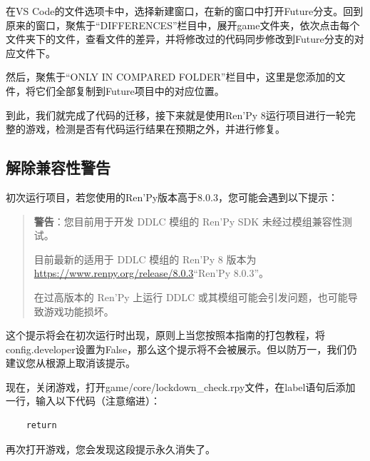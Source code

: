 在VS Code的文件选项卡中，选择新建窗口，在新的窗口中打开Future分支。回到原来的窗口，聚焦于“DIFFERENCES”栏目中，展开game文件夹，依次点击每个文件夹下的文件，查看文件的差异，并将修改过的代码同步修改到Future分支的对应文件下。

然后，聚焦于“ONLY IN COMPARED FOLDER”栏目中，这里是您添加的文件，将它们全部复制到Future项目中的对应位置。

到此，我们就完成了代码的迁移，接下来就是使用Ren'Py 8运行项目进行一轮完整的游戏，检测是否有代码运行结果在预期之外，并进行修复。

\subsection{解除兼容性警告}
初次运行项目，若您使用的Ren'Py版本高于8.0.3，您可能会遇到以下提示：

\begin{quote}
    \textbf{警告}：您目前用于开发 DDLC 模组的 Ren'Py SDK 未经过模组兼容性测试。

    目前最新的适用于 DDLC 模组的 Ren'Py 8 版本为\url{https://www.renpy.org/release/8.0.3}“Ren'Py 8.0.3”。
    
    在过高版本的 Ren'Py 上运行 DDLC 或其模组可能会引发问题，也可能导致游戏功能损坏。
\end{quote}

这个提示将会在初次运行时出现，原则上当您按照本指南的打包教程，将config.developer设置为False，那么这个提示将不会被展示。但以防万一，我们仍建议您从根源上取消该提示。

现在，关闭游戏，打开game/core/lockdown\_check.rpy文件，在label语句后添加一行，输入以下代码（注意缩进）：
\begin{lstlisting}
    return
\end{lstlisting}

再次打开游戏，您会发现这段提示永久消失了。
